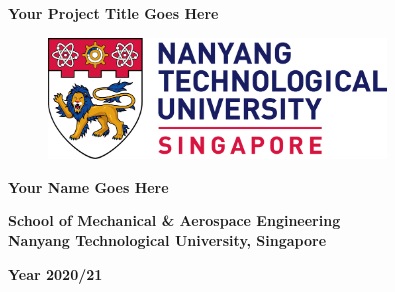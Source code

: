 

\begin{center}
\linespread{1}\huge\textbf{Your Project Title Goes Here}
\vspace{1.2in}
\end{center}

\begin{figure}[h]
    \centering
    \includegraphics[width=0.8\textwidth]{NTU_Logo.png}
\end{figure}

\begin{center}
\vspace{1.2in}
\textbf{Your Name Goes Here}
\vspace{1.2in}

\textbf{School of Mechanical \& Aerospace Engineering\\Nanyang Technological University, Singapore}
\vspace{1.2in}

\textbf{Year 2020/21}
\end{center}